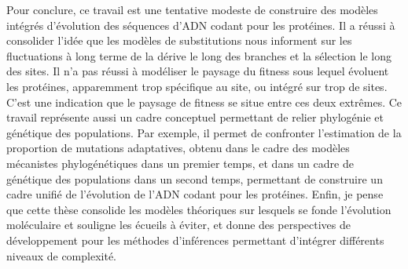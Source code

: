 Pour conclure, ce travail est une tentative modeste de construire des modèles intégrés d'évolution des séquences d'ADN codant pour les protéines.
Il a réussi à consolider l'idée que les modèles de substitutions nous informent sur les fluctuations à long terme de la dérive le long des branches et la sélection le long des sites.
Il n'a pas réussi à modéliser le paysage du fitness sous lequel évoluent les protéines, apparemment trop spécifique au site, ou intégré sur trop de sites.
C'est une indication que le paysage de fitness se situe entre ces deux extrêmes.
Ce travail représente aussi un cadre conceptuel permettant de relier phylogénie et génétique des populations.
Par exemple, il permet de confronter l'estimation de la proportion de mutations adaptatives, obtenu dans le cadre des modèles mécanistes phylogénétiques dans un premier temps, et dans un cadre de génétique des populations dans un second temps, permettant de construire un cadre unifié de l'évolution de l'ADN codant pour les protéines.
Enfin, je pense que cette thèse consolide les modèles théoriques sur lesquels se fonde l'évolution moléculaire et souligne les écueils à éviter, et donne des perspectives de développement pour les méthodes d'inférences permettant d'intégrer différents niveaux de complexité.